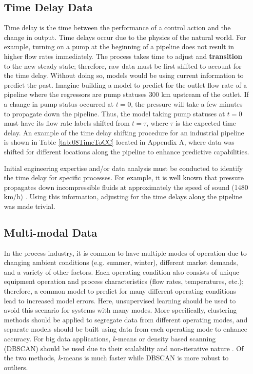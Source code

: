 \subsection{Time Delay Data}
Time delay is the time between the performance of a control action and the change in output. Time delays occur due to the physics of the natural world.  For example, turning on a pump at the beginning of a pipeline does not result in higher flow rates immediately.  The process takes time to adjust and \textbf{transition} to the new steady state; therefore, raw data must be first shifted to account for the time delay.  Without doing so, models would be using current information to predict the past.  Imagine building a model to predict for the outlet flow rate of a pipeline where the regressors are pump statuses 300 km upstream of the outlet.  If a change in pump status occurred at $t = 0$, the pressure will take a few minutes to propagate down the pipeline.  Thus, the model taking pump statuses at $t = 0$ must have its flow rate labels shifted from $t = \tau$, where $\tau$ is the expected time delay.  An example of the time delay shifting procedure for an industrial pipeline is shown in Table \ref{tab:08TimeToCC} located in Appendix A, where data was shifted for different locations along the pipeline to enhance predictive capabilities.

Initial engineering expertise and/or data analysis must be conducted to identify the time delay for specific processes.  For example, it is well known that pressure propagates down incompressible fluids at approximately the speed of sound (1480 km/h) \cite{fluid_mechanics}.  Using this information, adjusting for the time delays along the pipeline was made trivial.

\subsection{Multi-modal Data}
In the process industry, it is common to have multiple modes of operation due to changing ambient conditions (e.g. summer, winter), different market demands, and a variety of other factors.  Each operating condition also consists of unique equipment operation and process characteristics (flow rates, temperatures, etc.); therefore, a common model to predict for many different operating conditions lead to increased model errors.  Here, unsupervised learning should be used to avoid this scenario for systems with many modes.  More specifically, clustering methods should be applied to segregate data from different operating modes, and separate models should be built using data from each operating mode to enhance accuracy.  For big data applications, \textit{k}-means or density based scanning (DBSCAN) should be used due to their scalability and non-iterative nature \cite{clustering_complexity}. Of the two methods, \textit{k}-means is much faster while DBSCAN is more robust to outliers.

